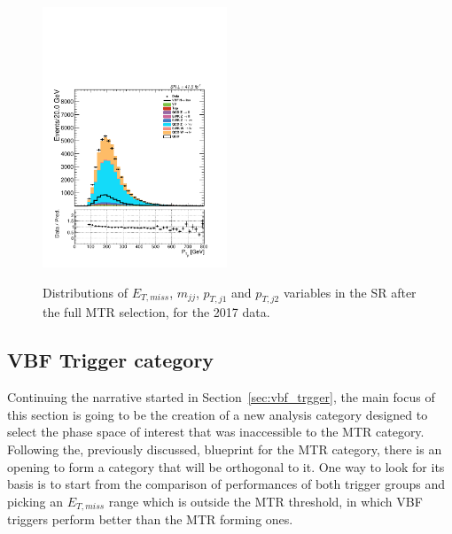\begin{figure}[htbp]
{    \includegraphics[width=0.49\textwidth]{Analysis_strategy/MTR_2017_SR/Leading_jet_pt.pdf}
    }
  \caption{Distributions of $E_{T,miss}$, $m_{jj}$, $p_{T,j1}$ and $p_{T,j2}$ variables in the SR after the full MTR selection, for the 2017 data.}
  \label{fig:sr_n-1_shapes_2}
\end{figure}







\subsection{VBF Trigger category}
\label{subsec:vtr_selection}
\hspace{10pt} Continuing the narrative started in Section~\ref{sec:vbf_trgger}, the main focus of this section is going to be the creation of a new analysis category designed to select the phase space of interest that was inaccessible to the MTR category. Following the, previously discussed, blueprint for the MTR category, there is an opening to form a category that will be orthogonal to it. One way to look for its basis is to start from the comparison of performances of both trigger groups and picking an $E_{T,miss}$ range which is outside the MTR threshold, in which VBF triggers perform better than the MTR forming ones. 

